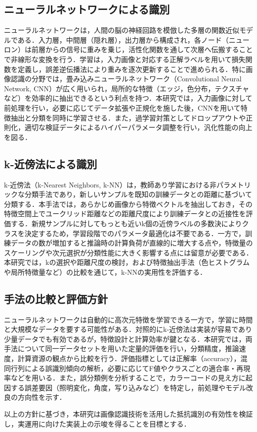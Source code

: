 \subsection*{ニューラルネットワークによる識別}
ニューラルネットワークは，人間の脳の神経回路を模倣した多層の関数近似モデルである．入力層，中間層（隠れ層），出力層から構成され，各ノード（ニューロン）は前層からの信号に重みを乗じ，活性化関数を通して次層へ伝搬することで非線形な変換を行う．学習は，入力画像と対応する正解ラベルを用いて損失関数を定義し，誤差逆伝播法により重みを逐次更新することで進められる．特に画像認識の分野では，畳み込みニューラルネットワーク（Convolutional Neural Network, CNN）が広く用いられ，局所的な特徴（エッジ，色分布，テクスチャなど）を効率的に抽出できるという利点を持つ．本研究では，入力画像に対して前処理を行い，必要に応じてデータ拡張や正規化を施した後，CNNを用いて特徴抽出と分類を同時に学習させる．また，過学習対策としてドロップアウトや正則化，適切な検証データによるハイパーパラメータ調整を行い，汎化性能の向上を図る．

\subsection*{k-近傍法による識別}
k-近傍法（k-Nearest Neighbors, k-NN）は，教師あり学習における非パラメトリックな分類手法であり，新しいサンプルを既知の訓練データとの距離に基づいて分類する．本手法では，あらかじめ画像から特徴ベクトルを抽出しておき，その特徴空間上でユークリッド距離などの距離尺度により訓練データとの近接性を評価する．新規サンプルに対してもっとも近いk個の近傍ラベルの多数決によりクラスを決定するため，学習段階でのパラメータ最適化は不要である．一方で，訓練データの数が増加すると推論時の計算負荷が直線的に増大する点や，特徴量のスケーリングや次元選択が分類性能に大きく影響する点には留意が必要である．本研究では，kの選択や距離尺度の検討，および特徴抽出手法（色ヒストグラムや局所特徴量など）の比較を通じて，k-NNの実用性を評価する．

\subsection*{手法の比較と評価方針}
ニューラルネットワークは自動的に高次元特徴を学習できる一方で，学習に時間と大規模なデータを要する可能性がある．対照的にk-近傍法は実装が容易であり少量データでも有効であるが，特徴設計と計算効率が鍵となる．本研究では，両手法について同一データセットを用いた定量的評価を行い，分類精度，推論速度，計算資源の観点から比較を行う．評価指標としては正解率（accuracy），混同行列による誤識別傾向の解析，必要に応じてF値やクラスごとの適合率・再現率などを用いる．また，誤分類例を分析することで，カラーコードの見え方に起因する誤差要因（照明変化，角度，写り込みなど）を特定し，前処理やモデル改良の方向性を示す．

以上の方針に基づき，本研究は画像認識技術を活用した抵抗識別の有効性を検証し，実運用に向けた実装上の示唆を得ることを目標とする．





